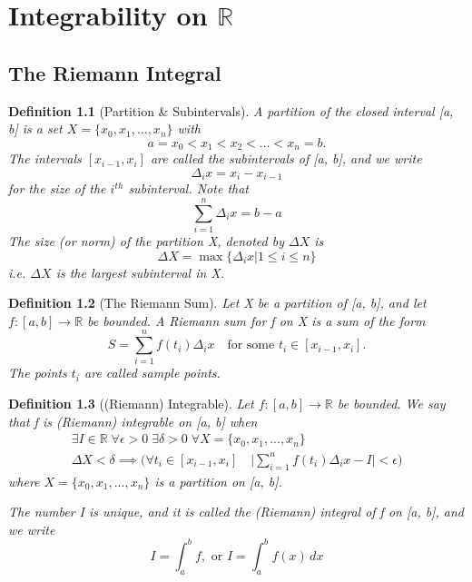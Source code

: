 \documentclass[11pt, oneside]{book}
\theoremstyle{break}
\newtheorem{defn}{Definition}[section]
\newcommand{\bb}[1]{\mathbb{#1}}		%
\begin{document}
\chapter{Integrability on \texorpdfstring{$\bb{R}$}{R}}

\section{The Riemann Integral}

\begin{defn}[Partition \& Subintervals]
	A partition of the closed interval [a, b] is a set $X = \{x_0, x_1, ..., x_n\}$ with
	\[
		a = x_0 < x_1 < x_2 < \hdots < x_n = b.
	\]
	The intervals $[x_{i-1}, x_i]$ are called the subintervals of [a, b], and we write
	\[
		\Delta_i x = x_i - x_{i-1}
	\]
	for the size of the $i^{th}$ subinterval. Note that
	\[
		\sum_{i=1}^{n} \Delta_i x = b - a
	\]
	The size (or norm) of the partition X, denoted by $\Delta X$ is
	\[
		\Delta X = \max \{\Delta_i x | 1 \leq i \leq n\}
	\]
	i.e. $\Delta X$ is the largest subinterval in X.
\end{defn}

\begin{defn}[The Riemann Sum]
	Let X be a partition of [a, b], and let $f: [a, b] \to \bb{R}$ be bounded. A Riemann sum for f on X is a sum of the form
	\[
		S = \sum_{i=1}^{n} f(t_i) \Delta_i x \quad \text{for some } t_i \in [x_{i - 1}, x_i].
	\]
	The points $t_i$ are called sample points.
\end{defn}

\begin{defn}[(Riemann) Integrable]
	Let $f: [a, b] \to \bb{R}$ be bounded. We say that f is (Riemann) integrable on [a, b] when
	\begin{gather*}
		\exists I \in \bb{R} \; \forall \epsilon > 0 \; \exists \delta > 0 \; \forall X = \{x_0, x_1, ..., x_n\} \\
		\Delta X < \delta \implies \bigg(\forall t_i \in [x_{i -1}, x_i] \quad \Bigg|\sum_{i=1}^{n} f(t_i) \Delta_i x - I \Bigg| < \epsilon \bigg)
	\end{gather*}
	where $X = \{x_0, x_1, ..., x_n\}$ is a partition on [a, b].

	The number I is unique, and it is called the (Riemann) integral of f on [a, b], and we write
	\[
		I = \int_{a}^{b} f, \text{ or } I = \int_{a}^{b} f(x) \, dx
	\]
\end{defn}
\end{document}
